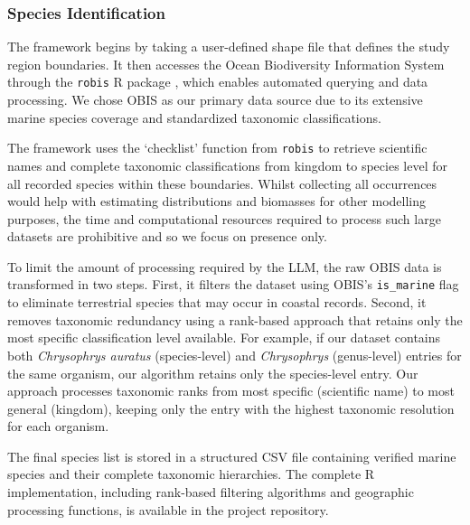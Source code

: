 \subsubsection{Species Identification}

The framework begins by taking a user-defined shape file that defines the study region boundaries. It then accesses the Ocean Biodiversity Information System \citep{Grassle1999} through the \texttt{robis} R package \citep{robis}, which enables automated querying and data processing. We chose OBIS as our primary data source due to its extensive marine species coverage and standardized taxonomic classifications. 

The framework uses the `checklist' function from \texttt{robis} to retrieve scientific names and complete taxonomic classifications from kingdom to species level for all recorded species within these boundaries. Whilst collecting all occurrences would help with estimating distributions and biomasses for other modelling purposes, the time and computational resources required to process such large datasets are prohibitive and so we focus on presence only. 

To limit the amount of processing required by the LLM, the raw OBIS data is transformed in two steps. First, it filters the dataset using OBIS's \texttt{is\_marine} flag to eliminate terrestrial species that may occur in coastal records. Second, it removes taxonomic redundancy using a rank-based approach that retains only the most specific classification level available. For example, if our dataset contains both \textit{Chrysophrys auratus} (species-level) and \textit{Chrysophrys} (genus-level) entries for the same organism, our algorithm retains only the species-level entry. Our approach processes taxonomic ranks from most specific (scientific name) to most general (kingdom), keeping only the entry with the highest taxonomic resolution for each organism. 

The final species list is stored in a structured CSV file containing verified marine species and their complete taxonomic hierarchies. The complete R implementation, including rank-based filtering algorithms and geographic processing functions, is available in the project repository.
